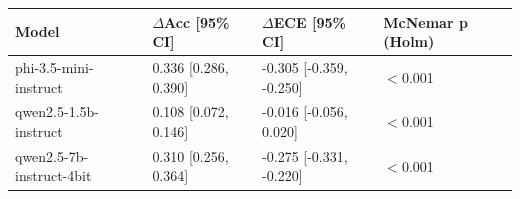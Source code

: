 \begin{tabular}{llll}
\toprule
Model & $\Delta$Acc [95\% CI] & $\Delta$ECE [95\% CI] & McNemar p (Holm) \\
\midrule
phi-3.5-mini-instruct & 0.336 [0.286, 0.390] & -0.305 [-0.359, -0.250] & $<$0.001 \\
qwen2.5-1.5b-instruct & 0.108 [0.072, 0.146] & -0.016 [-0.056, 0.020] & $<$0.001 \\
qwen2.5-7b-instruct-4bit & 0.310 [0.256, 0.364] & -0.275 [-0.331, -0.220] & $<$0.001 \\
\bottomrule
\end{tabular}

